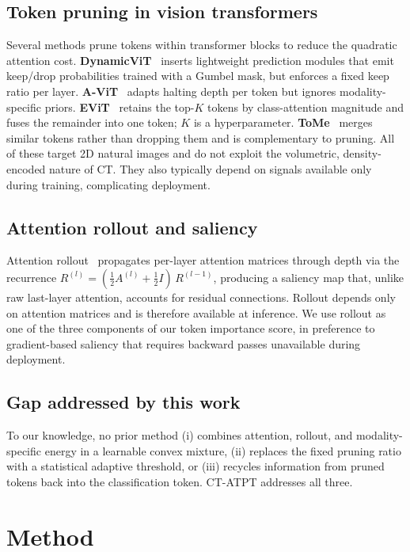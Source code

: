 \documentclass[journal]{IEEEtran}
\begin{document}
\subsection{Token pruning in vision transformers}
Several methods prune tokens within transformer blocks to reduce the quadratic
attention cost. \textbf{DynamicViT}~\cite{dynamicvit} inserts lightweight
prediction modules that emit keep/drop probabilities trained with a Gumbel
mask, but enforces a fixed keep ratio per layer.
\textbf{A-ViT}~\cite{avit} adapts halting depth per token but ignores
modality-specific priors. \textbf{EViT}~\cite{evit} retains the top-$K$
tokens by class-attention magnitude and fuses the remainder into one token;
$K$ is a hyperparameter. \textbf{ToMe}~\cite{tome} merges similar tokens
rather than dropping them and is complementary to pruning. All of these
target 2D natural images and do not exploit the volumetric, density-encoded
nature of CT. They also typically depend on signals available only during
training, complicating deployment.

\subsection{Attention rollout and saliency}
Attention rollout~\cite{abnar2020} propagates per-layer attention matrices
through depth via the recurrence
$R^{(l)} = (\tfrac{1}{2} A^{(l)} + \tfrac{1}{2} I)\, R^{(l-1)}$, producing
a saliency map that, unlike raw last-layer attention, accounts for residual
connections. Rollout depends only on attention matrices and is therefore
available at inference. We use rollout as one of the three components of our
token importance score, in preference to gradient-based saliency that requires
backward passes unavailable during deployment.

\subsection{Gap addressed by this work}
To our knowledge, no prior method (i) combines attention, rollout, and
modality-specific energy in a learnable convex mixture, (ii) replaces the
fixed pruning ratio with a statistical adaptive threshold, or (iii) recycles
information from pruned tokens back into the classification token. CT-ATPT
addresses all three.

\section{Method}\label{sec:method}
\end{document}
